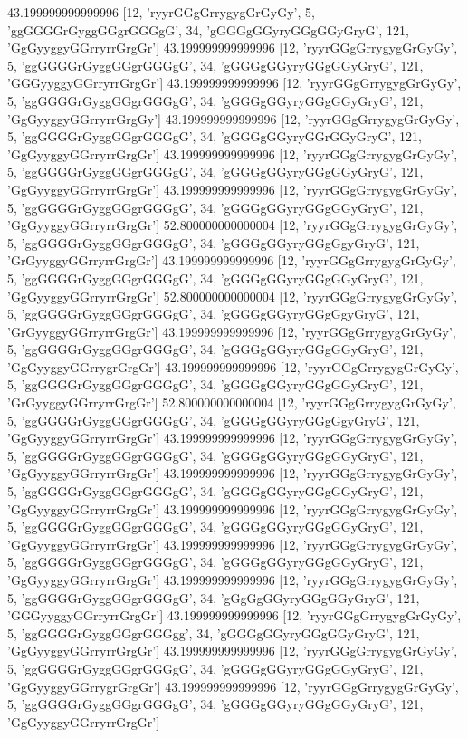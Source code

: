 43.199999999999996 [12, 'ryyrGGgGrrygygGrGyGy', 5, 'ggGGGGrGyggGGgrGGGgG', 34, 'gGGGgGGyryGGgGGyGryG', 121, 'GgGyyggyGGrryrrGrgGr']
43.199999999999996 [12, 'ryyrGGgGrrygygGrGyGy', 5, 'ggGGGGrGyggGGgrGGGgG', 34, 'gGGGgGGyryGGgGGyGryG', 121, 'GGGyyggyGGrryrrGrgGr']
43.199999999999996 [12, 'ryyrGGgGrrygygGrGyGy', 5, 'ggGGGGrGyggGGgrGGGgG', 34, 'gGGGgGGyryGGgGGyGryG', 121, 'GgGyyggyGGrryrrGrgGy']
43.199999999999996 [12, 'ryyrGGgGrrygygGrGyGy', 5, 'ggGGGGrGyggGGgrGGGgG', 34, 'gGGGgGGyryGGrGGyGryG', 121, 'GgGyyggyGGrryrrGrgGr']
43.199999999999996 [12, 'ryyrGGgGrrygygGrGyGy', 5, 'ggGGGGrGyggGGgrGGGgG', 34, 'gGGGgGGyryGGgGGyGryG', 121, 'GgGyyggyGGrryrrGrgGr']
43.199999999999996 [12, 'ryyrGGgGrrygygGrGyGy', 5, 'ggGGGGrGyggGGgrGGGgG', 34, 'gGGGgGGyryGGgGGyGryG', 121, 'GgGyyggyGGrryrrGrgGr']
52.800000000000004 [12, 'ryyrGGgGrrygygGrGyGy', 5, 'ggGGGGrGyggGGgrGGGgG', 34, 'gGGGgGGyryGGgGgyGryG', 121, 'GrGyyggyGGrryrrGrgGr']
43.199999999999996 [12, 'ryyrGGgGrrygygGrGyGy', 5, 'ggGGGGrGyggGGgrGGGgG', 34, 'gGGGgGGyryGGgGGyGryG', 121, 'GgGyyggyGGrryrrGrgGr']
52.800000000000004 [12, 'ryyrGGgGrrygygGrGyGy', 5, 'ggGGGGrGyggGGgrGGGgG', 34, 'gGGGgGGyryGGgGgyGryG', 121, 'GrGyyggyGGrryrrGrgGr']
43.199999999999996 [12, 'ryyrGGgGrrygygGrGyGy', 5, 'ggGGGGrGyggGGgrGGGgG', 34, 'gGGGgGGyryGGgGGyGryG', 121, 'GgGyyggyGGrrygrGrgGr']
43.199999999999996 [12, 'ryyrGGgGrrygygGrGyGy', 5, 'ggGGGGrGyggGGgrGGGgG', 34, 'gGGGgGGyryGGgGGyGryG', 121, 'GrGyyggyGGrryrrGrgGr']
52.800000000000004 [12, 'ryyrGGgGrrygygGrGyGy', 5, 'ggGGGGrGyggGGgrGGGgG', 34, 'gGGGgGGyryGGgGgyGryG', 121, 'GgGyyggyGGrryrrGrgGr']
43.199999999999996 [12, 'ryyrGGgGrrygygGrGyGy', 5, 'ggGGGGrGyggGGgrGGGgG', 34, 'gGGGgGGyryGGgGGyGryG', 121, 'GgGyyggyGGrryrrGrgGr']
43.199999999999996 [12, 'ryyrGGgGrrygygGrGyGy', 5, 'ggGGGGrGyggGGgrGGGgG', 34, 'gGGGgGGyryGGgGGyGryG', 121, 'GgGyyggyGGrryrrGrgGr']
43.199999999999996 [12, 'ryyrGGgGrrygygGrGyGy', 5, 'ggGGGGrGyggGGgrGGGgG', 34, 'gGGGgGGyryGGgGGyGryG', 121, 'GgGyyggyGGrryrrGrgGr']
43.199999999999996 [12, 'ryyrGGgGrrygygGrGyGy', 5, 'ggGGGGrGyggGGgrGGGgG', 34, 'gGGGgGGyryGGgGGyGryG', 121, 'GgGyyggyGGrryrrGrgGr']
43.199999999999996 [12, 'ryyrGGgGrrygygGrGyGy', 5, 'ggGGGGrGyggGGgrGGGgG', 34, 'gGgGgGGyryGGgGGyGryG', 121, 'GGGyyggyGGrryrrGrgGr']
43.199999999999996 [12, 'ryyrGGgGrrygygGrGyGy', 5, 'ggGGGGrGyggGGgrGGGgg', 34, 'gGGGgGGyryGGgGGyGryG', 121, 'GgGyyggyGGrryrrGrgGr']
43.199999999999996 [12, 'ryyrGGgGrrygygGrGyGy', 5, 'ggGGGGrGyggGGgrGGGgG', 34, 'gGGGgGGyryGGgGGyGryG', 121, 'GgGyyggyGGrrygrGrgGr']
43.199999999999996 [12, 'ryyrGGgGrrygygGrGyGy', 5, 'ggGGGGrGyggGGgrGGGgG', 34, 'gGGGgGGyryGGgGGyGryG', 121, 'GgGyyggyGGrryrrGrgGr']
